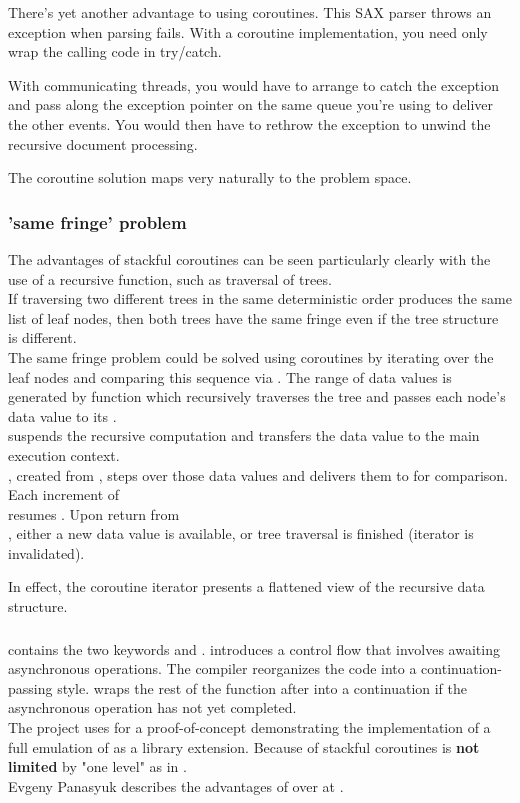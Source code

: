 There's yet another advantage to using coroutines. This SAX parser throws an
exception when parsing fails. With a coroutine implementation, you need only
wrap the calling code in try/catch.

With communicating threads, you would have to arrange to catch the exception
and pass along the exception pointer on the same queue you're using to deliver
the other events. You would then have to rethrow the exception to unwind the
recursive document processing.

The coroutine solution maps very naturally to the problem space.

\subsubsection*{'same fringe' problem}
The advantages of stackful coroutines can be seen particularly clearly with
the use of a recursive function, such as traversal of trees.\\
If traversing two different trees in the same deterministic order produces the
same list of leaf nodes, then both trees have the same fringe even if the tree
structure is different.\\
\newline
The same fringe problem could be solved using coroutines by iterating over the
leaf nodes and comparing this sequence via . The range of data
values is generated by function  which recursively traverses the
tree and passes each node's data value to its \pushcoro.\\
\pushcoro suspends the recursive computation and transfers the data value to
the main execution context.\\
\pullcoroiterator, created from \pullcoro, steps over those data values and
delivers them to  for comparison. Each increment of\\
\pullcoroiterator resumes . Upon return from\\
, either a new data value is available, or
tree traversal is finished (iterator is invalidated).

In effect, the coroutine iterator presents a flattened view of the recursive
data structure.

\subsubsection*{\csharp \await}
\csharp contains the two keywords \async and \await. \async introduces a
control flow that involves awaiting asynchronous operations. The compiler
reorganizes the code into a continuation-passing style. \await wraps the rest
of the function after \await into a continuation if the asynchronous
operation has not yet completed.\\
The project \awaitemu uses \boostcoroutine for a proof-of-concept
demonstrating the implementation of a full emulation of \csharp \await as a
library extension. Because of stackful coroutines \await is \textbf{not limited}
by "one level" as in \csharp.\\
Evgeny Panasyuk describes the advantages of \boostcoroutine over \await at
\channelnine.
